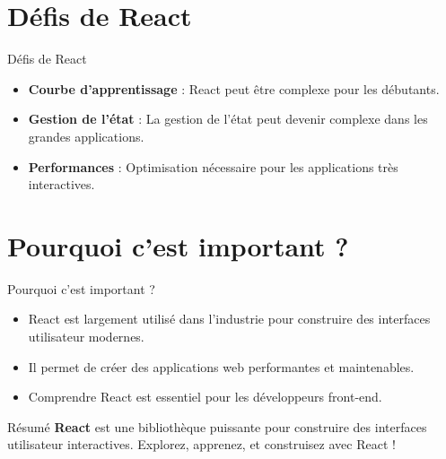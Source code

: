 \documentclass{clbeamer2024}
\begin{document}
	\section{Défis de React}
	\begin{frame}{Défis de React}
		\begin{itemize}
			\item \textbf{Courbe d'apprentissage} : React peut être complexe pour les débutants.
			\item \textbf{Gestion de l'état} : La gestion de l'état peut devenir complexe dans les grandes applications.
			\item \textbf{Performances} : Optimisation nécessaire pour les applications très interactives.
		\end{itemize}
	\end{frame}
	
	\section{Pourquoi c'est important ?}
	\begin{frame}{Pourquoi c'est important ?}
		\begin{itemize}
			\item React est largement utilisé dans l'industrie pour construire des interfaces utilisateur modernes.
			\item Il permet de créer des applications web performantes et maintenables.
			\item Comprendre React est essentiel pour les développeurs front-end.
		\end{itemize}
	\end{frame}
	
	
	\begin{frame}{Résumé}
		\textbf{React} est une bibliothèque puissante pour construire des interfaces utilisateur interactives.  
		Explorez, apprenez, et construisez avec React !
	\end{frame}
	

	
\end{document}
